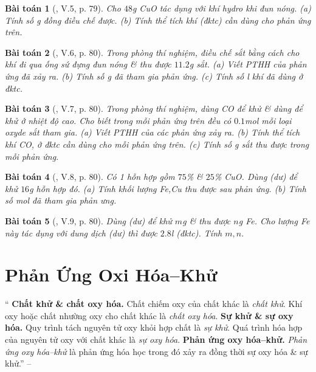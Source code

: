 \documentclass{article}
\newtheorem{baitoan}{Bài toán}
\begin{document}
\begin{baitoan}[\cite{Truong_BTNC_Hoa_Hoc_8_2022}, V.5, p. 79]
	Cho $48$\emph{g CuO} tác dụng với khí hydro khi đun nóng. (a) Tính số \emph{g} đồng điều chế được. (b) Tính thể tích khí \emph{} (đktc) cần dùng cho phản ứng trên.
\end{baitoan}

\begin{baitoan}[\cite{Truong_BTNC_Hoa_Hoc_8_2022}, V.6, p. 80]
	Trong phòng thí nghiệm, điều chế sắt bằng cách cho khí \emph{} đi qua ống sứ đựng \emph{} đun nóng \& thu được $11.2$\emph{g} sắt. (a) Viết PTHH của phản ứng đã xảy ra. (b) Tính số \emph{g } đã tham gia phản ứng. (c) Tính số \emph{l} khí \emph{} đã dùng ở đktc.
\end{baitoan}

\begin{baitoan}[\cite{Truong_BTNC_Hoa_Hoc_8_2022}, V.7, p. 80]
	Trong phòng thí nghiệm, dùng \emph{CO} để khử \emph{} \& dùng \emph{} để khử \emph{} ở nhiệt độ cao. Cho biết trong mỗi phản ứng trên đều có $0.1$\emph{mol} mỗi loại oxyde sắt tham gia. (a) Viết PTHH của các phản ứng xảy ra. (b) Tính thể tích khí \emph{CO,} ở đktc cần dùng cho mỗi phản ứng trên. (c) Tính số \emph{g} sắt thu được trong mỗi phản ứng. 
\end{baitoan}

\begin{baitoan}[\cite{Truong_BTNC_Hoa_Hoc_8_2022}, V.8, p. 80]
	Có 1 hỗn hợp gồm $75$\% \emph{} \& $25$\% \emph{CuO}. Dùng \emph{} (dư) để khử $16$\emph{g} hỗn hợp đó. (a) Tính khối lượng \emph{Fe,Cu} thu được sau phản ứng. (b) Tính số mol \emph{} đã tham gia phản ưng.
\end{baitoan}

\begin{baitoan}[\cite{Truong_BTNC_Hoa_Hoc_8_2022}, V.9, p. 80]
	Dùng \emph{} (dư) để khử $m$\emph{g} \emph{}  \& thu được $n$\emph{g Fe}. Cho lượng \emph{Fe} này tác dụng với dung dịch \emph{} (dư) thì được $2.8$\emph{l } (đktc). Tính $m,n$.
\end{baitoan}


\section{Phản Ứng Oxi Hóa--Khử}
`` \textsf{\textbf{Chất khử \& chất oxy hóa.}} Chất chiếm oxy của chất khác là \textit{chất khử}. Khí oxy hoặc chất nhường oxy cho chất khác là \textit{chất oxy hóa}.  \textsf{\textbf{Sự khử \& sự oxy hóa.}} Quy trình tách nguyên tử oxy khỏi hợp chất là \textit{sự khử}. Quá trình hóa hợp của nguyên tử oxy với chất khác là \textit{sự oxy hóa}.  \textsf{\textbf{Phản ứng oxy hóa--khử.}} \textit{Phản ứng oxy hóa--khử} là phản ứng hóa học trong đó xảy ra đồng thời sự oxy hóa \& sự khử.'' -- \cite[Chap. 5, \S2, pp. 80--81]{Truong_BTNC_Hoa_Hoc_8_2022}
\end{document}
